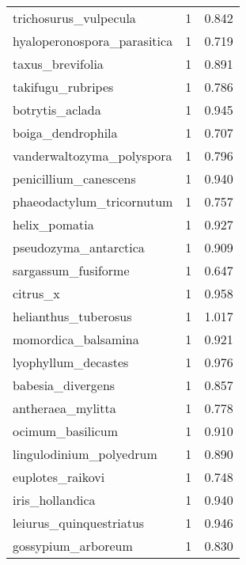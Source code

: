 \begin{tabular}{lrr}
          trichosurus\_vulpecula &                   1 &     0.842 \\
    hyaloperonospora\_parasitica &                   1 &     0.719 \\
               taxus\_brevifolia &                   1 &     0.891 \\
              takifugu\_rubripes &                   1 &     0.786 \\
                botrytis\_aclada &                   1 &     0.945 \\
              boiga\_dendrophila &                   1 &     0.707 \\
      vanderwaltozyma\_polyspora &                   1 &     0.796 \\
          penicillium\_canescens &                   1 &     0.940 \\
      phaeodactylum\_tricornutum &                   1 &     0.757 \\
                  helix\_pomatia &                   1 &     0.927 \\
          pseudozyma\_antarctica &                   1 &     0.909 \\
            sargassum\_fusiforme &                   1 &     0.647 \\
                       citrus\_x &                   1 &     0.958 \\
           helianthus\_tuberosus &                   1 &     1.017 \\
            momordica\_balsamina &                   1 &     0.921 \\
            lyophyllum\_decastes &                   1 &     0.976 \\
              babesia\_divergens &                   1 &     0.857 \\
              antheraea\_mylitta &                   1 &     0.778 \\
               ocimum\_basilicum &                   1 &     0.910 \\
        lingulodinium\_polyedrum &                   1 &     0.890 \\
               euplotes\_raikovi &                   1 &     0.748 \\
                iris\_hollandica &                   1 &     0.940 \\
        leiurus\_quinquestriatus &                   1 &     0.946 \\
             gossypium\_arboreum &                   1 &     0.830 \\

\end{tabular}

